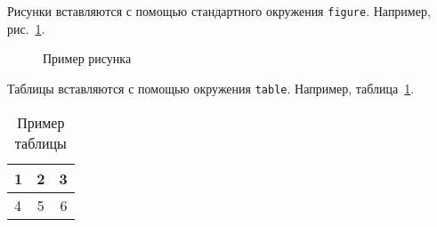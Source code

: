 Рисунки вставляются с помощью стандартного окружения \verb|figure|. Например, рис.~\ref{fig1}.

\begin{figure}
\centering
{}
\caption{Пример рисунка}
\label{fig1}
\end{figure}

Таблицы вставляются с помощью окружения \verb|table|. Например, таблица~\ref{tab1}.

\begin{table}%
\caption{Пример таблицы}
\centering
\begin{tabular}{|l|c|r|}
\hline
1 & 2 & 3\\\hline
4 & 5 & 6\\\hline
\end{tabular}
\label{tab1}
\end{table}